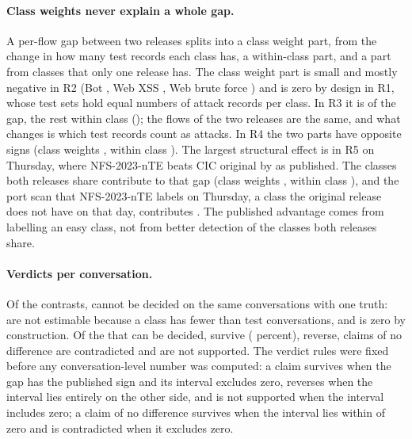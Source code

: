 \paragraph{Class weights never explain a whole gap.} A per-flow gap between two releases splits into a class weight part, from the change in how many test records each class has, a within-class part, and a part from classes that only one release has. The class weight part is small and mostly negative in R2 (Bot \RQfiveBotC{}, Web XSS \RQfiveXssC{}, Web brute force \RQfiveWebBfC{}) and is zero by design in R1, whose test sets hold equal numbers of attack records per class. In R3 it is \RQfiveQtwoC{} of the \RQfiveQtwoFlow{} gap, the rest within class (\RQfiveQtwoW{}); the flows of the two releases are the same, and what changes is which test records count as attacks. In R4 the two parts have opposite signs (class weights \RQfiveBinC{}, within class \RQfiveBinW{}). The largest structural effect is in R5 on Thursday, where NFS-2023-nTE beats CIC original by \RQfiveThuNteCicPub{} as published. The classes both releases share contribute \RQfiveThuNteCicShared{} to that gap (class weights \RQfiveThuNteCicC{}, within class \RQfiveThuNteCicW{}), and the port scan that NFS-2023-nTE labels on Thursday, a class the original release does not have on that day, contributes \RQfiveThuNteCicNonshared{}. The published advantage comes from labelling an easy class, not from better detection of the classes both releases share.

\paragraph{Verdicts per conversation.} Of the \RQfiveRows{} contrasts, \RevFiveUndecided{} cannot be decided on the same conversations with one truth: \RQfiveNotEstimable{} are not estimable because a class has fewer than \SetMinTest{} test conversations, and \RQfiveZero{} is zero by construction. Of the \RevFiveDecided{} that can be decided, \RQfiveSurvive{} survive (\RevFiveSurvivePct{} percent), \RQfiveReverse{} reverse, \RQfiveContradicted{} claims of no difference are contradicted and \RQfiveNotSupported{} are not supported. The verdict rules were fixed before any conversation-level number was computed: a claim survives when the gap has the published sign and its interval excludes zero, reverses when the interval lies entirely on the other side, and is not supported when the interval includes zero; a claim of no difference survives when the interval lies within  of zero and is contradicted when it excludes zero.

